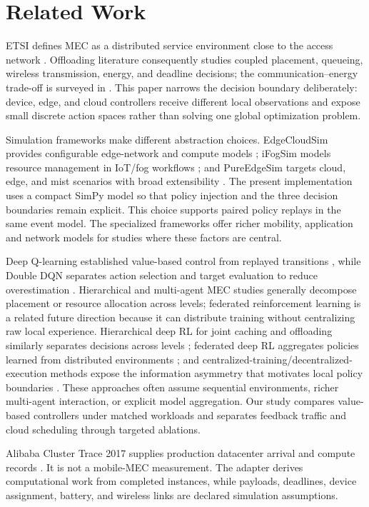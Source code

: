 \section{Related Work}
ETSI defines MEC as a distributed service environment close to the access
network \cite{etsiMec003}. Offloading literature consequently studies coupled
placement, queueing, wireless transmission, energy, and deadline decisions;
the communication--energy trade-off is surveyed in \cite{mao2017drloffload}.
This paper narrows the decision boundary deliberately: device, edge, and cloud
controllers receive different local observations and expose small discrete
action spaces rather than solving one global optimization problem.

Simulation frameworks make different abstraction choices. EdgeCloudSim
provides configurable edge-network and compute models
\cite{sonmez2018edgecloudsim}; iFogSim models resource management in
IoT/fog workflows \cite{gupta2017ifogsim}; and PureEdgeSim targets cloud,
edge, and mist scenarios with broad extensibility
\cite{pureedgesim}. The present implementation uses a compact SimPy model so
that policy injection and the three decision boundaries remain explicit. This choice supports paired policy replays in the same event model.
The specialized frameworks offer richer mobility, application and network
models for studies where these factors are central.

Deep Q-learning established value-based control from replayed transitions
\cite{mnih2015human}, while Double DQN separates action selection and target
evaluation to reduce overestimation \cite{hasselt2016double}. Hierarchical and
multi-agent MEC studies generally decompose placement or resource allocation
across levels; federated reinforcement learning is a related future direction
because it can distribute training without centralizing raw local experience.
Hierarchical deep RL for joint caching and offloading similarly separates
decisions across levels \cite{sun2024hierarchical}; federated deep RL
aggregates policies learned from distributed environments \cite{zhuo2019federated};
and centralized-training/decentralized-execution methods expose the
information asymmetry that motivates local policy boundaries
\cite{lowe2017multiagent}. These approaches often assume sequential
environments, richer multi-agent interaction, or explicit model aggregation.
Our study compares value-based controllers under matched workloads and
separates feedback traffic and cloud scheduling through targeted ablations.

Alibaba Cluster Trace 2017 supplies production datacenter arrival and compute
records \cite{alibaba2017}. It is not a mobile-MEC measurement. The adapter
derives computational work from completed instances, while payloads, deadlines,
device assignment, battery, and wireless links are declared simulation
assumptions.
